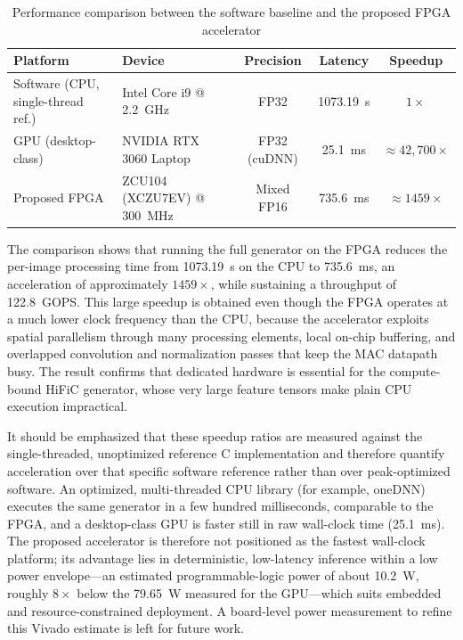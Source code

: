 \begin{table}[H]
    \centering
    \caption{Performance comparison between the software baseline and the proposed FPGA accelerator}
    \label{tab:performance_comparison}
    \begin{tabular}{|>{\raggedright\arraybackslash}p{2.6cm}|>{\raggedright\arraybackslash}p{3.6cm}|c|c|c|}
        \hline
        \textbf{Platform} & \textbf{Device} & \textbf{Precision} & \textbf{Latency} & \textbf{Speedup} \\
        \hline
        Software (CPU, single-thread ref.) & Intel Core i9 @ 2.2~GHz & FP32 & 1073.19~s & $1\times$ \\
        \hline
        GPU (desktop-class) & NVIDIA RTX 3060 Laptop & FP32 (cuDNN) & 25.1~ms & $\approx 42{,}700\times$ \\
        \hline
        Proposed FPGA & ZCU104 (XCZU7EV) @ 300~MHz & Mixed FP16 & 735.6~ms & $\approx 1459\times$ \\
        \hline
    \end{tabular}
\end{table}

The comparison shows that running the full generator on the FPGA reduces the per-image processing time from 1073.19~s on the CPU to 735.6~ms, an acceleration of approximately $1459\times$, while sustaining a throughput of 122.8~GOPS. This large speedup is obtained even though the FPGA operates at a much lower clock frequency than the CPU, because the accelerator exploits spatial parallelism through many processing elements, local on-chip buffering, and overlapped convolution and normalization passes that keep the MAC datapath busy. The result confirms that dedicated hardware is essential for the compute-bound HiFiC generator, whose very large feature tensors make plain CPU execution impractical.

It should be emphasized that these speedup ratios are measured against the single-threaded, unoptimized reference C implementation and therefore quantify acceleration over that specific software reference rather than over peak-optimized software. An optimized, multi-threaded CPU library (for example, oneDNN) executes the same generator in a few hundred milliseconds, comparable to the FPGA, and a desktop-class GPU is faster still in raw wall-clock time (25.1~ms). The proposed accelerator is therefore not positioned as the fastest wall-clock platform; its advantage lies in deterministic, low-latency inference within a low power envelope---an estimated programmable-logic power of about 10.2~W, roughly $8\times$ below the 79.65~W measured for the GPU---which suits embedded and resource-constrained deployment. A board-level power measurement to refine this Vivado estimate is left for future work.

